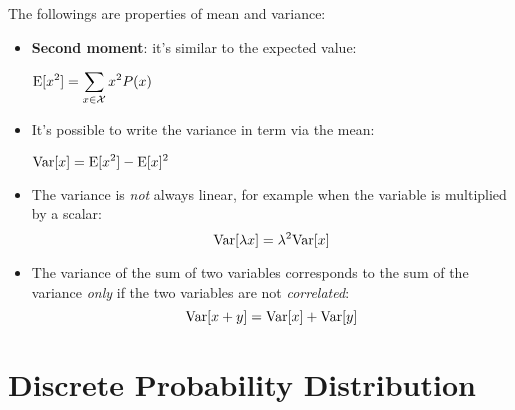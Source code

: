 The followings are properties of mean and variance:
\begin{itemize}
	\item \textbf{Second moment}: it's similar to the expected value:
		\begin{center}
			$\displaystyle \text{E}[x^2]=\displaystyle\sum_{x\in\mathcal{X}}x^2P(x)$
		\end{center} 
	\item It's possible to write the variance in term via the mean:
		\begin{center}
			$\displaystyle \text{Var}[x]=\text{E}[x^2]-\text{E}[x]^2$
		\end{center}
	\item The variance is \textit{not} always linear, for example when the variable is multiplied by a scalar:
		\begin{equation}
			\displaystyle \text{Var}[\lambda x]=\lambda^2\text{Var}[x]
			\label{eq:varianceNotLinear1}
		\end{equation}
	\item The variance of the sum of two variables corresponds to the sum of the variance \textit{only} if the two variables are not \textit{correlated}:
		\begin{equation}
			\displaystyle \text{Var}[x+y]=\text{Var}[x]+\text{Var}[y]
			\label{eq:varianceNotLinear2}
		\end{equation}
\end{itemize}
%
%
%
\section{Discrete Probability Distribution}
%
%
